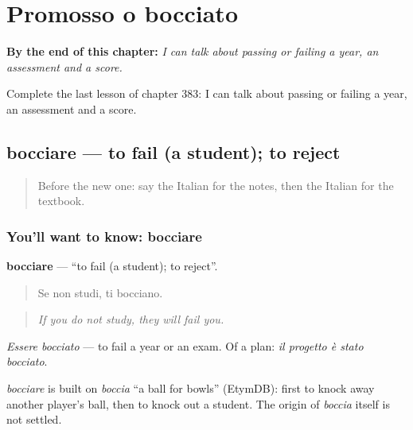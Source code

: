 
\chapter{Promosso o bocciato}
\label{ch:it-promosso-o-bocciato}

\begin{chapteropening}
\textbf{By the end of this chapter:} \emph{I can talk about passing or failing a year, an assessment and a score.}

Complete the last lesson of chapter 383: I can talk about passing or failing a year, an assessment and a score.
\end{chapteropening}

\section[bocciare]{bocciare — to fail (a student); to reject}

\label{lesson:IT-C383-bocciare}



\begin{quote}
Before the new one: say the Italian for the notes, then the Italian for the textbook.
\end{quote}

\subsection*{You'll want to know: bocciare}
\textbf{bocciare} — \textquotedblleft{}to fail (a student); to reject\textquotedblright{}.

\begin{quote}
Se non studi, ti bocciano.
\end{quote}

\begin{quote}
\emph{If you do not study, they will fail you.}
\end{quote}

\emph{Essere bocciato} — to fail a year or an exam. Of a plan: \emph{il progetto è stato bocciato}.

\begin{cousinweb}
\emph{bocciare} is built on \emph{boccia} \textquotedblleft{}a ball for bowls\textquotedblright{} (EtymDB): first to knock away another player's ball, then to knock out a student. The origin of \emph{boccia} itself is not settled.
\end{cousinweb}

